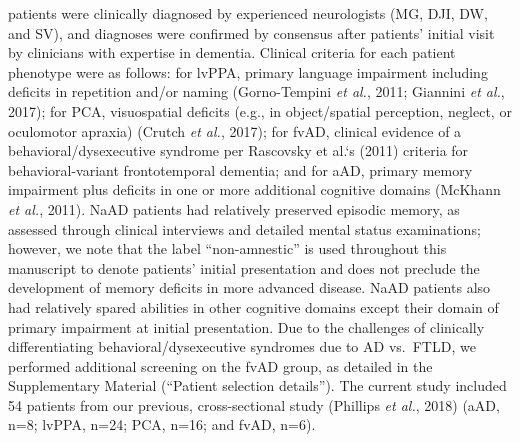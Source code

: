\documentclass[]{article}
\begin{document}
patients were clinically diagnosed by experienced neurologists (MG, DJI,
DW, and SV), and diagnoses were confirmed by consensus after patients'
initial visit by clinicians with expertise in dementia. Clinical
criteria for each patient phenotype were as follows: for lvPPA, primary
language impairment including deficits in repetition and/or naming
(Gorno-Tempini \emph{et al.}, 2011; Giannini \emph{et al.}, 2017); for
PCA, visuospatial deficits (e.g., in object/spatial perception, neglect,
or oculomotor apraxia) (Crutch \emph{et al.}, 2017); for fvAD, clinical
evidence of a behavioral/dysexecutive syndrome per Rascovsky et al.`s
(2011) criteria for behavioral-variant frontotemporal dementia; and for
aAD, primary memory impairment plus deficits in one or more additional
cognitive domains (McKhann \emph{et al.}, 2011). NaAD patients had
relatively preserved episodic memory, as assessed through clinical
interviews and detailed mental status examinations; however, we note
that the label ``non-amnestic'' is used throughout this manuscript to
denote patients' initial presentation and does not preclude the
development of memory deficits in more advanced disease. NaAD patients
also had relatively spared abilities in other cognitive domains except
their domain of primary impairment at initial presentation. Due to the
challenges of clinically differentiating behavioral/dysexecutive
syndromes due to AD vs.~FTLD, we performed additional screening on the
fvAD group, as detailed in the Supplementary Material (``Patient
selection details''). The current study included 54 patients from our
previous, cross-sectional study (Phillips \emph{et al.}, 2018) (aAD,
n=8; lvPPA, n=24; PCA, n=16; and fvAD, n=6).
\end{document}
